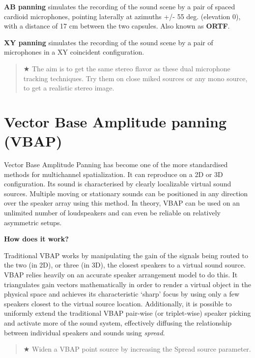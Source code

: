 \documentclass[
  letterpaper,
  DIV=11,
  numbers=noendperiod]{scrreport}
\begin{document}
\textbf{AB panning} simulates the recording of the sound scene by a pair
of spaced cardioid microphones, pointing laterally at azimuths +/- 55
deg. (elevation 0), with a distance of 17 cm between the two capsules.
Also known as \textbf{ORTF}.

\textbf{XY panning} simulates the recording of the sound scene by a pair
of microphones in a XY coincident configuration.

\begin{quote}
★ The aim is to get the same stereo flavor as these dual microphone
tracking techniques. Try them on close miked sources or any mono source,
to get a realistic stereo image.
\end{quote}

\hypertarget{vector-base-amplitude-panning-vbap}{%
\section{Vector Base Amplitude panning
(VBAP)}\label{vector-base-amplitude-panning-vbap}}

Vector Base Amplitude Panning has become one of the more standardised
methods for multichannel spatialization. It can reproduce on a 2D or 3D
configuration. Its sound is characterised by clearly localizable virtual
sound sources. Multiple moving or stationary sounds can be positioned in
any direction over the speaker array using this method. In theory, VBAP
can be used on an unlimited number of loudspeakers and can even be
reliable on relatively asymmetric setups.

\textbf{How does it work?}

Traditional VBAP works by manipulating the gain of the signals being
routed to the two (in 2D), or three (in 3D), the closest speakers to a
virtual sound source. VBAP relies heavily on an accurate speaker
arrangement model to do this. It triangulates gain vectors
mathematically in order to render a virtual object in the physical space
and achieves its characteristic `sharp' focus by using only a few
speakers closest to the virtual source location. Additionally, it is
possible to uniformly extend the traditional VBAP pair-wise (or
triplet-wise) speaker picking and activate more of the sound system,
effectively diffusing the relationship between individual speakers and
sounds using \emph{spread}.

\begin{quote}
★ Widen a VBAP point source by increasing the Spread source parameter.
\end{quote}
\end{document}

